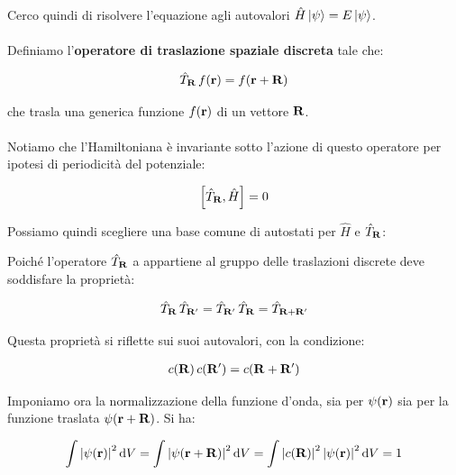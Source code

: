 	Cerco quindi di risolvere l'equazione agli autovalori $\hat{H} \ket{\psi} = E \ket{\psi}$. 
	\\
	\\
	Definiamo l'\textbf{operatore di traslazione spaziale discreta} tale che:
	
\begin{align*}
	\hat{T}_{\vb{R}} \, f\qty(\vb{r}) = f\qty(\vb{r} + \vb{R})
\end{align*}
	
	che trasla una generica funzione $f\qty(\vb{r})$ di un vettore $\vb{R}$. 
	\\
	\\
	Notiamo che l'Hamiltoniana è invariante sotto l'azione di questo operatore per ipotesi di periodicità del potenziale:
	
\begin{align*}
	\qty[\hat{T}_{\vb{R}}, \hat{H}] = 0
\end{align*}

	Possiamo quindi scegliere una base comune di autostati per $\hat{H}$ e $\hat{T}_{\vb{R}}$:
	
	
	Poiché l'operatore $\hat{T}_{\vb{R}}$ a appartiene al gruppo delle traslazioni discrete deve soddisfare la proprietà:
	
\begin{align*}
	\hat{T}_{\vb{R}} \, \hat{T}_{\vb{R'}} = \hat{T}_{\vb{R'}} \, \hat{T}_{\vb{R}} = \hat{T}_{\vb{R} + \vb{R'}}
\end{align*}

	Questa proprietà si riflette sui suoi autovalori, con la condizione:
	
\begin{align*}
	c\qty(\vb{R}) \, c\qty(\vb{R'}) = c\qty(\vb{R} + \vb{R'})
\end{align*}	

	Imponiamo ora la normalizzazione della funzione d'onda, sia per $\psi\qty(\vb{r})$ sia per la funzione traslata $\psi\qty(\vb{r} + \vb{R})$. Si ha:
	
\begin{align*}
	\int \qty|\psi\qty(\vb{r})|^2 \, \dd V = \int \qty|\psi\qty(\vb{r} + \vb{R})|^2 \, \dd V = \int \qty|c\qty(\vb{R})|^2 \, \qty|\psi\qty(\vb{r})|^2 \, \dd V = 1
\end{align*}

